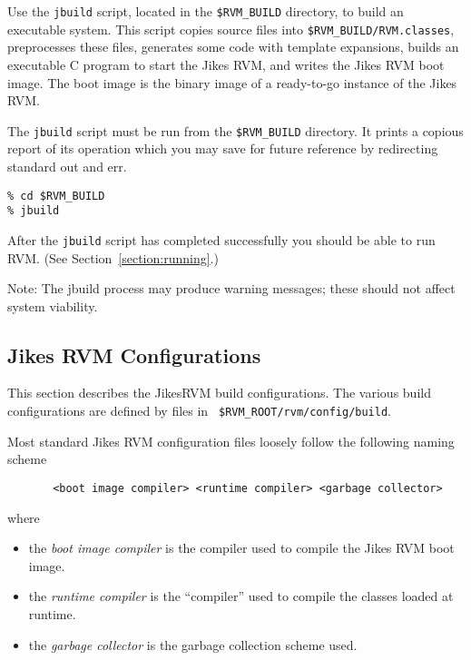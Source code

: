 \begin{enumerate}
Use the {\tt jbuild} script, located in the {\tt \$RVM\_BUILD} directory,
to build an executable system.  This script copies source files into
{\tt \$RVM\_BUILD/RVM.classes}, preprocesses these files, generates
some code with template expansions, builds an executable C program to
start the Jikes RVM, and writes the Jikes RVM boot image.  The boot
image is the binary image of a ready-to-go instance of the Jikes RVM.

The {\tt jbuild} script must be run from the {\tt \$RVM\_BUILD}
directory. It prints a copious report of its operation which you may
save for future reference by redirecting standard out and err.

\begin{verbatim}
% cd $RVM_BUILD
% jbuild
\end{verbatim}


After the {\tt jbuild} script has completed successfully you should be able 
to run RVM.  (See Section~\ref{section:running}.)

Note: The jbuild process may produce warning messages; these should not
affect system viability.

\end{enumerate}

\AIXPPCJikesTMFooter

\subsection{Jikes RVM Configurations}\label{configs}

This section describes the Jikes\trademark RVM build configurations.
The various 
build configurations are defined by files in {\tt
\$RVM\_ROOT/rvm/config/build}.

Most standard Jikes RVM configuration files loosely follow the
following naming scheme 
\begin{verbatim}
       <boot image compiler> <runtime compiler> <garbage collector>
\end{verbatim}

where
\begin{itemize}
\item the {\em boot image compiler} is the compiler used to compile
the Jikes RVM boot image. 
\item the {\em runtime compiler} is the ``compiler'' used to compile
the classes loaded at runtime.  
\item the {\em garbage collector} is the garbage collection scheme used.
\end{itemize}

